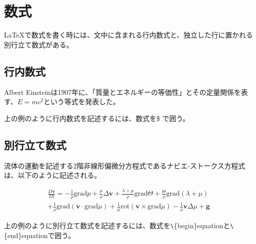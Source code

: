 \chapter{数式}

\LaTeX で数式を書く時には、文中に含まれる行内数式と、独立した行に置かれる別行立て数式がある。

\section{行内数式}

Albert Einsteinは1907年に、「質量とエネルギーの等価性」とその定量関係を表す、$E=mc^2$という等式を発表した。

上の例のように行内数式を記述するには、数式を\$ で囲う。

\section{別行立て数式}

流体の運動を記述する2階非線形偏微分方程式であるナビエ-ストークス方程式は、以下のように記述される。

\begin{multline*}
  \frac{D \bm{v}}{Dt} = - \frac{1}{\rho}\mathrm{grad}p + \frac{\mu}{\rho}\Delta\bm{v}
  + \frac{\lambda + \mu}{\rho}\mathrm{grad}\Theta +\frac{\Theta}{\rho}\mathrm{grad}(\lambda + \mu)\\
  + \frac{1}{\rho}\mathrm{grad}(\bm{v}\cdot\mathrm{grad}\mu)
  + \frac{1}{\mu}\mathrm{rot}(\bm{v}\times\mathrm{grad}\mu)
  - \frac{1}{\rho}\bm{v}\Delta\mu + \bm{g}
\end{multline*}

上の例のように別行立て数式を記述するには、数式を\verb|\|\{begin\}equationと\verb|\|\{end\}equationで囲う。